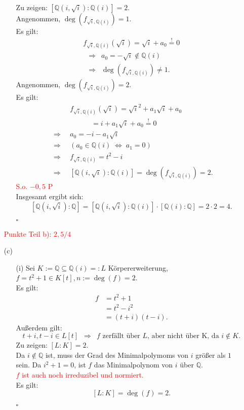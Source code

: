 \documentclass[12pt]{article}
\newcommand{\corr}[1]{\textcolor{red}{#1}}
\newcommand{\QED}{\begin{flushright} $\square$ \end{flushright}}
\newcommand{\df}{\enspace\Longrightarrow\enspace}
\newcommand{\gdw}{\;\Longleftrightarrow\;}
\newcommand{\grad}{\operatorname{deg}}
\begin{document}
\begin{enumerate}
\begin{enumerate}
		Zu zeigen: $[\mathbb{Q}(i,\sqrt{i}):\mathbb{Q}(i)]=2$. \\
		Angenommen, $\grad(f_{\sqrt{i},\mathbb{Q}(i)})=1$. \\
		Es gilt:
		\begin{align*}
			f_{\sqrt{i},\mathbb{Q}(i)}(\sqrt{i})=\sqrt{i}+a_0\overset{!}{=}0 \\
			\df a_0=-\sqrt{i}\notin\mathbb{Q}(i) \\
			\df \grad(f_{\sqrt{i},\mathbb{Q}(i)})\neq1.
		\end{align*}
		Angenommen, $\grad(f_{\sqrt{i},\mathbb{Q}(i)})=2$. \\
		Es gilt:
		\begin{align*}
			&f_{\sqrt{i},\mathbb{Q}(i)}(\sqrt{i})=\sqrt{i}^2+a_1\sqrt{i}+a_0 \\
			&\quad\quad\quad=i+a_1\sqrt{i}+a_0\overset{!}{=}0 \\
			\df &a_0=-i-a_1\sqrt{i} \\
			\df &(a_0\in\mathbb{Q}(i)\gdw a_1=0) \\
			\df &f_{\sqrt{i},\mathbb{Q}(i)}=t^2-i \\
			\df &[\mathbb{Q}(i,\sqrt{i}):\mathbb{Q}(i)]=\grad(f_{\sqrt{i},\mathbb{Q}(i)})=2.
		\end{align*}
\corr{S.o. $-0,5$ P}\\
		Insgesamt ergibt sich: $$[\mathbb{Q}(i,\sqrt{i}):\mathbb{Q}]=[\mathbb{Q}(i,\sqrt{i}):\mathbb{Q}(i)]\cdot[\mathbb{Q}(i):\mathbb{Q}]=2\cdot2=4.$$
		\QED
	\end{enumerate}
\corr{Punkte Teil b): $2,5/4$}
	

	\item[(c)] 
	\begin{enumerate}
		\item[(i)] Sei $K:=\mathbb{Q}\subseteq\mathbb{Q}(i)=:L$ Körpererweiterung, $f=t^2+1\in K[t],n:=\grad(f)=2$. \\
		Es gilt:
		\begin{align*}
			f&=t^2+1 \\
			&=t^2-i^2 \\
			&=(t+i)(t-i).
		\end{align*}
		Außerdem gilt: $$t+i,t-i\in L[t]\df f\text{ zerfällt über }L\text{, aber nicht über K, da }i\notin K.$$		
		Zu zeigen: $[L:K]=2$. \\
		Da $i\notin\mathbb{Q}$ ist, muss der Grad des Minimalpolymoms von $i$ größer als $1$ sein. Da $i^2+1=0$, ist $f$ das Minimalpolynom von $i$ über $\mathbb{Q}$. \\
\corr{$f$ ist auch noch irreduzibel und normiert.}\\
		Es gilt: $$[L:K]=\grad(f)=2.$$
		\QED
		

\end{enumerate}
\end{enumerate}
\end{document}
